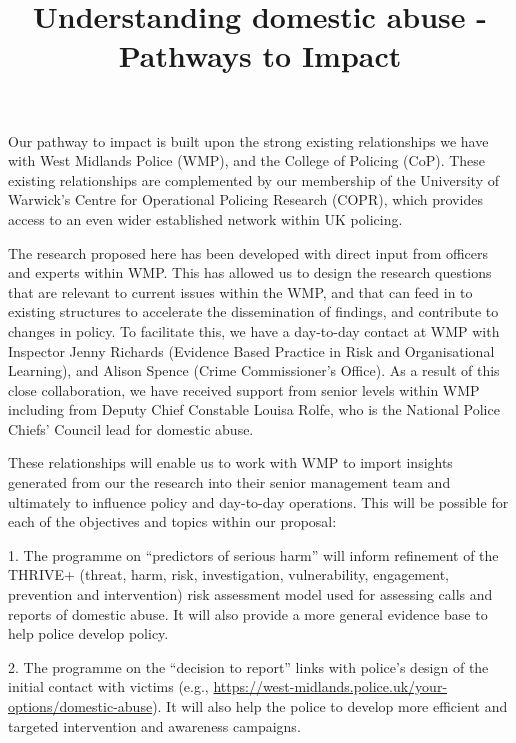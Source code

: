 \documentclass[11pt, a4paper]{article}
\begin{document}
\title{Understanding domestic abuse - Pathways to Impact}
\date{}
\maketitle


Our pathway to impact is built upon the strong existing relationships we have with West Midlands Police (WMP), and the College of Policing (CoP). These existing relationships are complemented by our membership of the University of Warwick's Centre for Operational Policing Research (COPR), which provides access to an even wider established network within UK policing. 

The research proposed here has been developed with direct input from officers and experts within WMP. This has allowed us to design the research questions that are relevant to current issues within the WMP, and that can feed in to existing structures to accelerate the dissemination of findings, and contribute to changes in policy. To facilitate this, we have a day-to-day contact at WMP with Inspector Jenny Richards (Evidence Based Practice in Risk and Organisational Learning), and Alison Spence (Crime Commissioner's Office). As a result of this close collaboration, we have received support from senior levels within WMP including from Deputy Chief Constable Louisa Rolfe, who is the National Police Chiefs' Council lead for domestic abuse.

These relationships will enable us to work with WMP to import insights generated from our the research into their senior management team and ultimately to influence policy and day-to-day operations. This will be possible for each of the objectives and topics within our proposal: 

1. The programme on ``predictors of serious harm'' will inform refinement of the THRIVE+ (threat, harm, risk, investigation, vulnerability, engagement, prevention and intervention) risk assessment model used for assessing calls and reports of domestic abuse. It will also provide a more general evidence base to help police develop policy.

2. The programme on the  ``decision to report'' links with police's design of the initial contact with victims (e.g., \url{https://west-midlands.police.uk/your-options/domestic-abuse}). It will also help the police to develop more efficient and targeted intervention and awareness campaigns.
\end{document}
